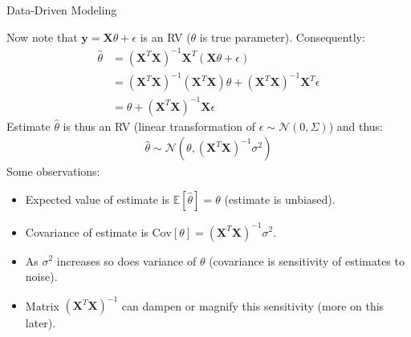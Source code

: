 \documentclass[handout,9pt]{beamer}
\begin{document}
%
\begin{frame}{Data-Driven Modeling}

Now note that $\mathbf{y}=\mathbf{X}\theta+\epsilon$ is an RV ($\theta$ is true parameter). Consequently: 
\begin{align*}
\hat{\theta}&=(\mathbf{X}^T\mathbf{X})^{-1}\mathbf{X}^T(\mathbf{X}\theta+\epsilon)\\
&=(\mathbf{X}^T\mathbf{X})^{-1}(\mathbf{X}^T\mathbf{X})\theta+(\mathbf{X}^T\mathbf{X})^{-1}\mathbf{X}^T\epsilon\\
&=\theta+(\mathbf{X}^T\mathbf{X})^{-1}\mathbf{X}\epsilon
\end{align*}
Estimate $\hat{\theta}$ is thus an RV (linear transformation of $\epsilon\sim\mathcal{N}(0,\Sigma)$)  and thus:
\begin{align*}
\hat{\theta}\sim\mathcal{N}(\theta,(\mathbf{X}^T\mathbf{X})^{-1}\sigma^2)
\end{align*}
Some observations:
\begin{itemize}
\setlength{\itemsep}{5pt}
\item Expected value of estimate is $\mathbb{E}[\hat{\theta}]=\theta$ (estimate is unbiased).
\item Covariance of estimate is $\textrm{Cov}[\theta]=(\mathbf{X}^T\mathbf{X})^{-1}\sigma^2$. 
\item As $\sigma^2$ increases so does variance of $\theta$ (covariance is sensitivity of estimates to noise).
\item Matrix $(\mathbf{X}^T\mathbf{X})^{-1}$ can dampen or magnify this sensitivity (more on this later).
\end{itemize}
\end{frame}
\end{document}
